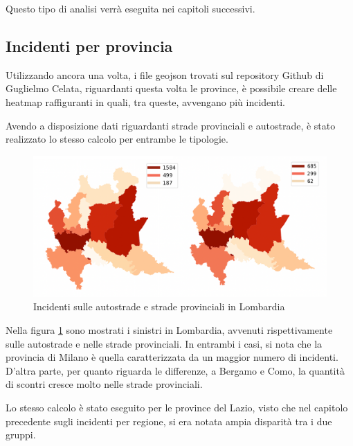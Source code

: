 \documentclass[a4paper,12pt]{report}
\begin{document}
Questo tipo di analisi verrà eseguita nei capitoli successivi.

\subsection{Incidenti per provincia}

Utilizzando ancora una volta, i file geojson trovati sul repository Github di 
Guglielmo Celata, riguardanti questa volta le province, 
è possibile creare delle heatmap raffiguranti in quali, tra queste, avvengano più 
incidenti.

Avendo a disposizione dati riguardanti strade provinciali e autostrade, 
è stato realizzato lo stesso calcolo per entrambe le tipologie.

\begin{figure}
    \includegraphics[width=\linewidth]{img_unite/lombardia_autostrade_provinciali.png}
    \caption{Incidenti sulle autostrade e strade provinciali in Lombardia}
    \label{fig:lombardia-strade}
\end{figure}

Nella figura \ref{fig:lombardia-strade} sono mostrati i sinistri in Lombardia, 
avvenuti rispettivamente sulle autostrade e nelle strade provinciali.
In entrambi i casi, si nota che la provincia di Milano è quella caratterizzata da 
un maggior numero di incidenti. 
D'altra parte, per quanto riguarda le differenze, a Bergamo e Como, 
la quantità di scontri cresce molto nelle strade provinciali.

Lo stesso calcolo è stato eseguito per le province del Lazio, visto che nel capitolo 
precedente sugli incidenti per regione, si era notata ampia disparità tra i due gruppi.
\end{document}
